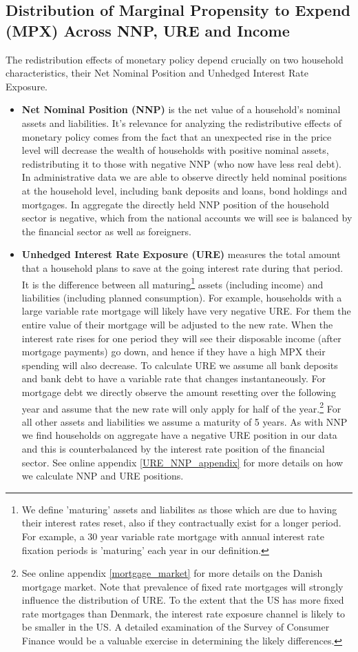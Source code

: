 \documentclass[titlepage]{\econtex}\newcommand{\texname}{ConsumptionHeterogeneity}
\begin{document}
\subsection{Distribution of Marginal Propensity to Expend (MPX) Across NNP, URE and Income}
The redistribution effects of monetary policy depend crucially on two household characteristics, their Net Nominal Position and Unhedged Interest Rate Exposure.
\begin{itemize}
	\item \textbf{Net Nominal Position (NNP)} is the net value of a household's nominal assets and liabilities. It's relevance for analyzing the redistributive effects of monetary policy comes from the fact that an unexpected rise in the price level will decrease the wealth of households with positive nominal assets, redistributing it to those with negative NNP (who now have less real debt). In administrative data we are able to observe directly held nominal positions at the household level, including bank deposits and loans, bond holdings and mortgages. In aggregate the directly held NNP position of the household sector is negative, which from the national accounts we will see is balanced by the financial sector as well as foreigners.
	\item \textbf{Unhedged Interest Rate Exposure (URE)} measures the total amount that a household plans to save at the going interest rate during that period. It is the difference between all maturing\footnote{We define 'maturing' assets and liabilites as those which are due to having their interest rates reset, also if they contractually exist for a longer period. For example, a 30 year variable rate mortgage with annual interest rate fixation periods is 'maturing' each year in our definition.} assets (including income) and liabilities (including planned consumption). For example, households with a large variable rate mortgage will likely have very negative URE. For them the entire value of their mortgage will be adjusted to the new rate. When the interest rate rises for one period they will see their disposable income (after mortgage payments) go down, and hence if they have a high MPX their spending will also decrease. To calculate URE we assume all bank deposits and bank debt to have a variable rate that changes instantaneously. For mortgage debt we directly observe the amount resetting over the following year and assume that the new rate will only apply for half of the year.\footnote{See online appendix \ref{mortgage_market} for more details on the Danish mortgage market. Note that prevalence of fixed rate mortgages will strongly influence the distribution of URE. To the extent that the US has more fixed rate mortgages than Denmark, the interest rate exposure channel is likely to be smaller in the US. A detailed examination of the Survey of Consumer Finance would be a valuable exercise in determining the likely differences.} For all other assets and liabilities we assume a maturity of 5 years. As with NNP we find households on aggregate have a negative URE position in our data and this is counterbalanced by the interest rate position of the financial sector. See online appendix \ref{URE_NNP_appendix} for more details on how we calculate NNP and URE positions.
\end{itemize}
\end{document}
